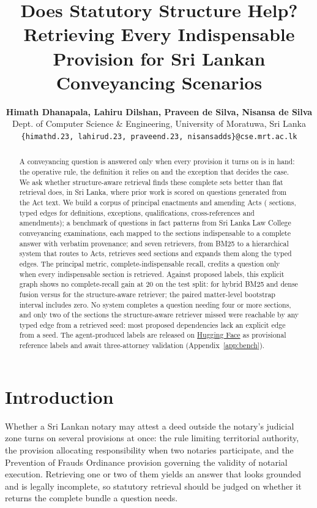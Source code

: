 \documentclass{article}
\title{Does Statutory Structure Help? Retrieving Every Indispensable Provision for Sri Lankan Conveyancing Scenarios}
\author{%
  \textbf{Himath Dhanapala, Lahiru Dilshan, Praveen de Silva, Nisansa de Silva}\\
  Dept. of Computer Science \& Engineering, University of Moratuwa, Sri Lanka\\
  \texttt{\{himathd.23, lahirud.23, praveend.23, nisansadds\}@cse.mrt.ac.lk}
}
\begin{document}
\maketitle

\begin{abstract}
A conveyancing question is answered only when every provision it turns on is
in hand: the operative rule, the definition it relies on and the exception
that decides the case. We ask whether structure-aware retrieval finds these
complete sets better than flat retrieval does, in Sri Lanka, where prior work
is scored on questions generated from the Act text. We build a corpus of
\nPrincipal{} principal enactments and \nAmending{} amending Acts (\nSections{}
sections, \nEdges{} typed edges for definitions, exceptions, qualifications,
cross-references and amendments); a benchmark of \nGoldQ{} questions in
\nGoldM{} fact patterns from Sri Lanka Law College conveyancing examinations,
each mapped to the sections indispensable to a complete answer with verbatim
provenance; and seven retrievers, from BM25 to a hierarchical system that
routes to Acts, retrieves seed sections and expands them along the typed
edges. The principal metric, complete-indispensable recall, credits a question
only when every indispensable section is retrieved. Against proposed labels,
this explicit graph shows no complete-recall gain at 20 on the test split:
\cAtTwentyRef{} for hybrid BM25 and dense fusion versus \cAtTwentyOurs{} for
the structure-aware retriever; the paired matter-level bootstrap interval
includes zero. No system completes a
question needing four or more sections, and only two of the sections the
structure-aware retriever missed were reachable by any typed edge from a
retrieved seed: most proposed dependencies lack an explicit edge from a seed.
The agent-produced labels are released on
\href{https://huggingface.co/datasets/lanka-legal-nlp/draftly-statutory-retrieval/tree/v1.0-paper-provisional}{Hugging Face}
as provisional reference labels and await three-attorney validation
(Appendix~\ref{app:bench}).
\end{abstract}

\section{Introduction}

Whether a Sri Lankan notary may attest a deed outside the notary's judicial
zone turns on several provisions at once: the rule limiting territorial
authority, the provision allocating responsibility when two notaries
participate, and the Prevention of Frauds Ordinance provision governing the
validity of notarial execution. Retrieving one or two of them yields an answer
that looks grounded and is legally incomplete, so statutory retrieval should be
judged on whether it returns the complete bundle a question needs.
\end{document}
